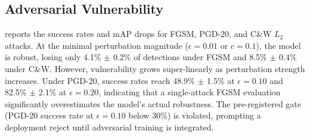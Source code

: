 \documentclass[10pt,twocolumn,letterpaper]{article}
\begin{document}
\subsection{Adversarial Vulnerability}
 reports the success rates and mAP drops for FGSM, PGD-20, and C\&W $L_2$ attacks. At the minimal perturbation magnitude ($\epsilon=0.01$ or $c=0.1$), the model is robust, losing only 4.1\% $\pm$ 0.2\% of detections under FGSM and 8.5\% $\pm$ 0.4\% under C\&W. However, vulnerability grows super-linearly as perturbation strength increases. Under PGD-20, success rates reach 48.9\% $\pm$ 1.5\% at $\epsilon=0.10$ and 82.5\% $\pm$ 2.1\% at $\epsilon=0.20$, indicating that a single-attack FGSM evaluation significantly overestimates the model's actual robustness. The pre-registered gate (PGD-20 success rate at $\epsilon=0.10$ below 30\%) is violated, prompting a deployment reject until adversarial training is integrated.

\begin{table}[htbp]
\centering
\caption{Adversarial attack success rate and mAP drop across perturbation magnitudes (mean $\pm$ std over 3 independent training seeds).}
\label{tab:adversarial}
\end{table}
\end{document}
